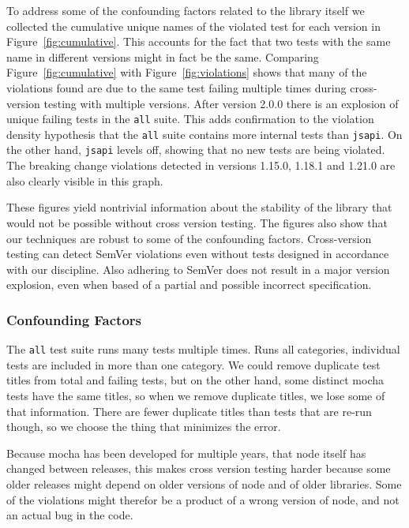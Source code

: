 To address some of the confounding factors related to the library
itself we collected the cumulative unique names of the violated test
for each version in Figure~\ref{fig:cumulative}. This accounts for the
fact that two tests with the same name in different versions might in
fact be the same.
%
Comparing Figure~\ref{fig:cumulative} with Figure~\ref{fig:violations}
shows that many of the violations found are due to the same test
failing multiple times during cross-version testing with multiple
versions.
%
After version 2.0.0 there is an explosion of unique failing tests in
the {\tt all} suite. 
%
This adds confirmation to the violation density hypothesis that the
{\tt all} suite contains more internal tests than {\tt jsapi}.
%
On the other hand, {\tt jsapi} levels off, showing that no new tests
are being violated.
%
The breaking change violations detected in versions 1.15.0, 1.18.1 and
1.21.0 are also clearly visible in this graph.

These figures yield nontrivial information about the stability of the
library that would not be possible without cross version testing. The
figures also show that our techniques are robust to some of the
confounding factors. Cross-version testing can detect SemVer
violations even without tests designed in accordance with our
discipline. Also adhering to SemVer does not result in a major version
explosion, even when based of a partial and possible incorrect
specification.

\subsubsection{Confounding Factors}

The {\tt all} test suite runs many tests multiple times. Runs all
categories, individual tests are included in more than one
category. We could remove duplicate test titles from total and failing
tests, but on the other hand, some distinct mocha tests have the same
titles, so when we remove duplicate titles, we lose some of that
information. There are fewer duplicate titles than tests that are
re-run though, so we choose the thing that minimizes the error.

Because mocha has been developed for multiple years, that node itself
has changed between releases, this makes cross version testing harder
because some older releases might depend on older versions of node and
of older libraries. Some of the violations might therefor be a product
of a wrong version of node, and not an actual bug in the code. 


